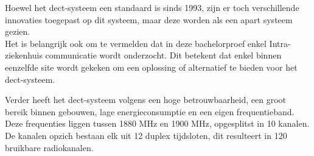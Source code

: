 Hoewel het \gls{dect}-systeem een standaard is sinds 1993, zijn er toch verschillende innovaties toegepast op dit systeem, maar deze worden als een apart systeem gezien. 
\\Het is belangrijk ook om te vermelden dat in deze bachelorproef enkel Intra-ziekenhuis communicatie wordt onderzocht. Dit betekent dat enkel binnen eenzelfde site wordt gekeken om een oplossing of alternatief te bieden voor het \gls{dect}-systeem.

Verder heeft het \gls{dect}-systeem volgens \textcite{Welinder1997}een hoge betrouwbaarheid, een groot bereik binnen gebouwen, lage energieconsumptie en een eigen frequentieband.
Deze frequenties liggen tussen 1880 MHz en 1900 MHz, opgesplitst in 10 kanalen. De kanalen opzich bestaan elk uit 12 duplex tijdsloten, dit resulteert in 120 bruikbare radiokanalen. \autocite{ETSI1999}

\section{}%
\label{sec:req}%








